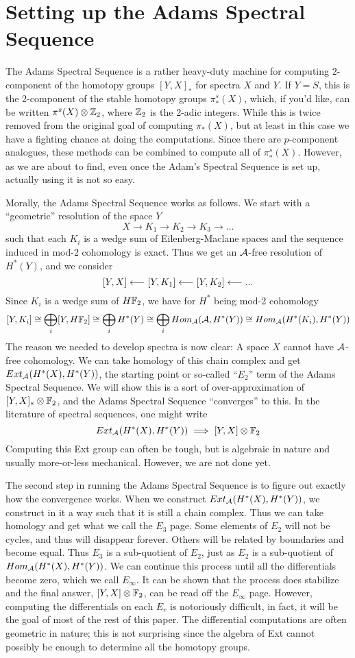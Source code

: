 \section{Setting up the Adams Spectral Sequence}

The Adams Spectral Sequence is a rather heavy-duty machine for computing $2$-component of the homotopy groups $[Y,X]_*$ for spectra $X$ and $Y$.  
If $Y=S$, this is the 2-component of the stable homotopy groups $\pi^s_*(X)$, which, if you'd like, can be written $\pi^s(X)\otimes \mathbb{Z}_2$, where $\mathbb{Z}_2$ is the 2-adic integers.  
While this is twice removed from the original goal of computing $\pi_*(X)$, but at least in this case we have a fighting chance at doing the computations.
Since there are $p$-component analogues, these methods can be combined to compute all of $\pi_*^s(X)$.  
However, as we are about to find, even once the Adam's Spectral Sequence is set up, actually using it is not so easy.  

Morally, the Adams Spectral Sequence works as follows.  
We start with a ``geometric'' resolution of the space $Y$
\[X\to K_1\to K_2\to K_3\to ...\]
such that each $K_i$ is a wedge sum of Eilenberg-Maclane spaces and the sequence induced in mod-2 cohomology is exact.  
Thus we get an $\mathcal{A}$-free resolution of $H^*(Y)$, and we consider 
\[[Y,X]\longleftarrow [Y,K_1]\longleftarrow [Y,K_2]\longleftarrow ...\]
Since $K_i$ is a wedge sum of $H\mathbb{F}_2$, we have for $H^*$ being mod-2 cohomology
\[[Y,K_i]\cong \bigoplus_i [Y,H\mathbb{F}_2]\cong \bigoplus_i H^*(Y) \cong \bigoplus_i Hom_{\mathcal{A}}(\mathcal{A},H^*(Y))\cong Hom_{\mathcal{A}}(H^*(K_i),H^*(Y))\]
The reason we needed to develop spectra is now clear: A space $X$ cannot have $\mathcal{A}$-free cohomology.  
We can take homology of this chain complex and get $Ext_{\mathcal{A}}(H^*(X),H^*(Y))$, the starting point or so-called ``$E_2$'' term of the Adams Spectral Sequence.  
We will show this is a sort of over-approximation of $[Y,X]_*\otimes \mathbb{F}_2$, and the Adams Spectral Sequence ``converges'' to this.  
In the literature of spectral sequences, one might write
\[Ext_{\mathcal{A}}(H^*(X),H^*(Y))\implies [Y,X]\otimes \mathbb{F}_2\]
Computing this Ext group can often be tough, but is algebraic in nature and usually more-or-less mechanical.  
However, we are not done yet.  


The second step in running the Adams Spectral Sequence is to figure out exactly how the convergence works.
When we construct $Ext_{\mathcal{A}}(H^*(X),H^*(Y))$, we construct in it a way such that it is still a chain complex.
Thus we can take homology and get what we call the $E_3$ page.
Some elements of $E_2$ will not be cycles, and thus will disappear forever.  
Others will be related by boundaries and become equal.  
Thus $E_3$ is a sub-quotient of $E_2$, just as $E_2$ is a sub-quotient of $Hom_{\mathcal{A}}(H^*(X),H^*(Y))$.  
We can continue this process until all the differentials become zero, which we call $E_\infty$.  
It can be shown that the process does stabilize and the final answer, $[Y,X]\otimes \mathbb{F}_2$, can be read off the $E_\infty$ page. 
However, computing the differentials on each $E_r$ is notoriously difficult, in fact, it will be the goal of most of the rest of this paper.  
The differential computations are often geometric in nature; this is not surprising since the algebra of Ext cannot possibly be enough to determine all the homotopy groups.  

